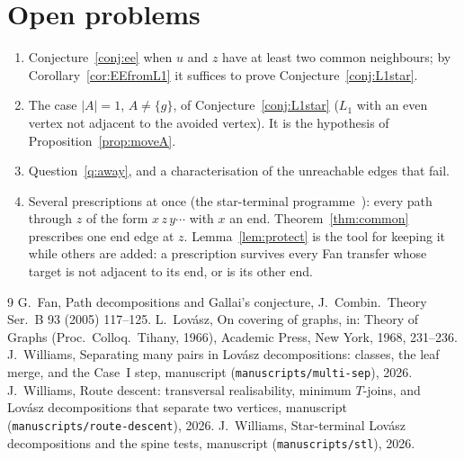 \documentclass[11pt]{amsart}
\theoremstyle{definition}
\begin{document}
\section{Open problems}\label{sec:open}
\begin{enumerate}
\item Conjecture~\ref{conj:ee} when $u$ and $z$ have at least two common neighbours; by
Corollary~\ref{cor:EEfromL1} it suffices to prove Conjecture~\ref{conj:L1star}.
\item The case $|A|=1$, $A\ne\{g\}$, of Conjecture~\ref{conj:L1star} ($L_1$ with an even vertex not adjacent
to the avoided vertex). It is the hypothesis of Proposition~\ref{prop:moveA}.
\item Question~\ref{q:away}, and a characterisation of the unreachable edges that fail.
\item Several prescriptions at once (the star-terminal programme~\cite{STL}): every path through $z$
of the form $x\,z\,y\cdots$ with $x$ an end. Theorem~\ref{thm:common} prescribes one end edge at $z$.
Lemma~\ref{lem:protect} is the tool for keeping it while others are added: a prescription survives
every Fan transfer whose target is not adjacent to its end, or is its other end.
\end{enumerate}

\begin{thebibliography}{9}
 G.~Fan, Path decompositions and Gallai's conjecture, J.~Combin.\ Theory Ser.~B 93 (2005)
117--125.
 L.~Lov\'asz, On covering of graphs, in: Theory of Graphs (Proc.\ Colloq.\ Tihany, 1966),
Academic Press, New York, 1968, 231--236.
 J.~Williams, Separating many pairs in Lov\'asz decompositions: classes, the leaf merge, and
the Case~I step, manuscript (\texttt{manuscripts/multi-sep}), 2026.
 J.~Williams, Route descent: transversal realisability, minimum $T$-joins, and Lov\'asz
decompositions that separate two vertices, manuscript (\texttt{manuscripts/route-descent}), 2026.
 J.~Williams, Star-terminal Lov\'asz decompositions and the spine tests, manuscript
(\texttt{manuscripts/stl}), 2026.
\end{thebibliography}
\end{document}
